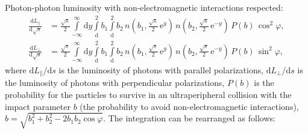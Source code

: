 \documentclass[a4paper,12pt]{article}
\begin{document}
Photon-photon luminosity with non-electromagnetic interactions respected:
\begin{equation}
  \begin{aligned}
    \frac{\mathrm{d} L_\parallel}{\mathrm{d} \sqrt{s}}
    &= \frac{\sqrt{s}}{2}
       \int\limits_{-\infty}^\infty \mathrm{d} y
       \int\limits_\mathrm{d}^2 b_1
       \int\limits_\mathrm{d}^2 b_2
       \, n \left( b_1, \tfrac{\sqrt{s}}{2} \, \mathrm{e}^y \right)
       \, n \left( b_2, \tfrac{\sqrt{s}}{2} \, \mathrm{e}^{-y} \right)
       \, P(b)
       \, \cos^2 \varphi,
    \\
    \frac{\mathrm{d} L_\perp}{\mathrm{d} \sqrt{s}}
    &= \frac{\sqrt{s}}{2}
       \int\limits_{-\infty}^\infty \mathrm{d} y
       \int\limits_\mathrm{d}^2 b_1
       \int\limits_\mathrm{d}^2 b_2
       \, n \left( b_1, \tfrac{\sqrt{s}}{2} \, \mathrm{e}^y \right)
       \, n \left( b_2, \tfrac{\sqrt{s}}{2} \, \mathrm{e}^{-y} \right)
       \, P(b)
       \, \sin^2 \varphi,
  \end{aligned}
\end{equation}
where $\mathrm{d} L_\parallel / \mathrm{d} s$ is the luminosity of photons with
parallel polarizations, $\mathrm{d} L_\perp / \mathrm{d} s$ is the luminosity
of photons with perpendicular polarizations, $P(b)$ is the probability for the
particles to survive in an ultraperipheral collision with the impact parameter
$b$ (the probability to avoid non-electromagnetic interactions), $b =
\sqrt{b_1^2 + b_2^2 - 2 b_1 b_2 \cos \varphi}$. The integration can be
rearranged as follows:
\end{document}
